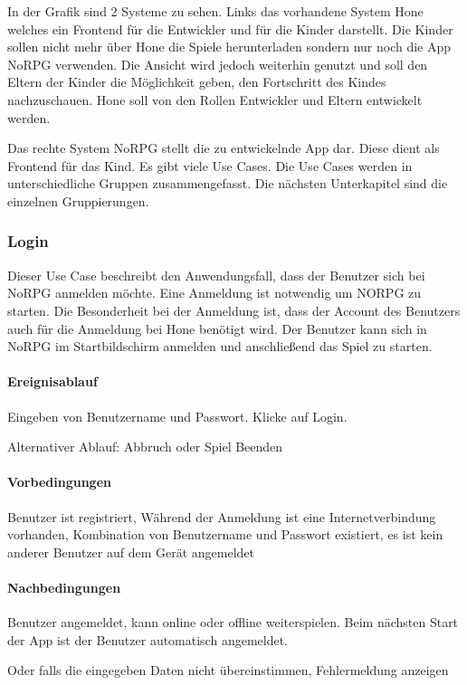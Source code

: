 		In der Grafik sind 2 Systeme zu sehen. Links das vorhandene System Hone welches ein Frontend für die Entwickler und für die Kinder darstellt. Die Kinder sollen nicht mehr über Hone die Spiele herunterladen sondern nur noch die App NoRPG verwenden. Die Ansicht wird jedoch weiterhin genutzt und soll den Eltern der Kinder die Möglichkeit geben, den Fortschritt des Kindes nachzuschauen. Hone soll von den Rollen Entwickler und Eltern entwickelt werden.
	
		Das rechte System NoRPG stellt die zu entwickelnde App dar. Diese dient als Frontend für das Kind. Es gibt viele Use Cases. Die Use Cases werden in unterschiedliche Gruppen zusammengefasst. Die nächsten Unterkapitel sind die einzelnen Gruppierungen.
	
		\subsubsection{Login}
			Dieser Use Case beschreibt den Anwendungsfall, dass der Benutzer sich bei NoRPG anmelden möchte. Eine Anmeldung ist notwendig um NORPG zu starten. Die Besonderheit bei der Anmeldung  ist, dass der Account des Benutzers auch für die Anmeldung bei Hone benötigt wird. Der Benutzer kann sich in NoRPG im Startbildschirm anmelden und anschließend das Spiel zu starten.
			
			\paragraph{Ereignisablauf}
				Eingeben von Benutzername und Passwort.	Klicke auf Login.
			
				Alternativer Ablauf: Abbruch oder Spiel Beenden
			
			\paragraph{Vorbedingungen}
				Benutzer ist registriert, Während der Anmeldung ist eine Internetverbindung vorhanden, Kombination von Benutzername und Passwort existiert, es ist kein anderer Benutzer auf dem Gerät angemeldet
			
			\paragraph{Nachbedingungen}
				Benutzer angemeldet, kann online oder offline weiterspielen. Beim nächsten Start der App ist der Benutzer automatisch angemeldet.
			
				Oder falls die eingegeben Daten nicht übereinstimmen, Fehlermeldung anzeigen
	
